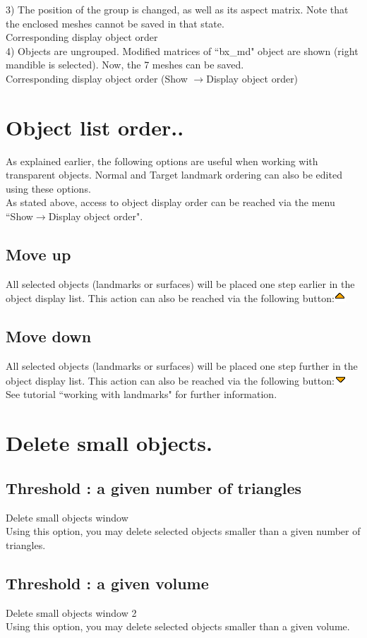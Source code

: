 3) The position of the group is changed, as well as its aspect matrix. Note that the enclosed meshes cannot be saved in that state.\\
Corresponding display object order\\

4) Objects are ungrouped. Modified matrices of ``bx\_md" object are shown (right mandible is selected). Now, the 7 meshes can be saved.\\
Corresponding display object order (Show $\rightarrow$Display object order)

\section{Object list order..}
As explained earlier, the following options are useful when working with transparent objects. Normal and Target landmark ordering can also be edited using these options.
\\As stated above, access to object display order can be reached via the menu ``Show$\rightarrow$Display object order".

\subsection{Move up}
All selected objects (landmarks or surfaces) will be placed one step earlier in the object display list.
This action can also be reached via the following button:\includegraphics[scale=0.7]{images/pixmap/s_dessous_17.png}

\subsection{Move down}
All selected objects (landmarks or surfaces) will be placed one step further in the object display list.
This action can also be reached via the following button:\includegraphics[scale=0.7]{images/pixmap/s_dessus_17.png}
See tutorial ``working with landmarks" for further information.

\section{Delete small objects.}
\subsection{Threshold : a given number of triangles}
Delete small objects window\\

Using this option, you may delete selected objects smaller than a given number of triangles.

\subsection{Threshold : a given volume}
Delete small objects window 2\\
Using this option, you may delete selected objects smaller than
a given volume.
